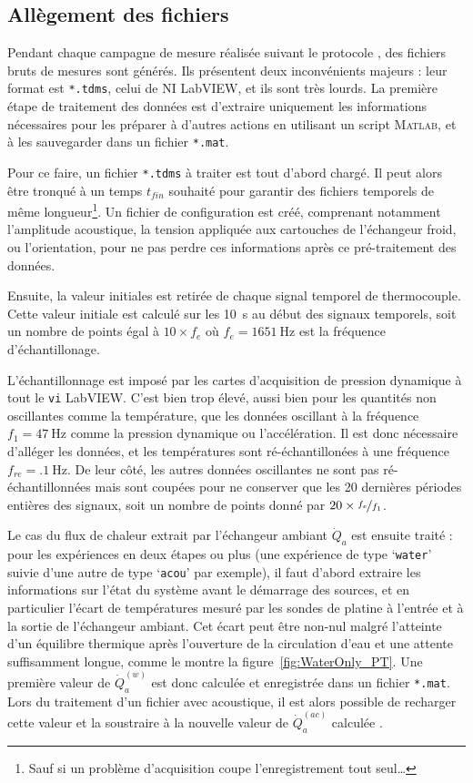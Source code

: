 \subsection{Allègement des fichiers}
Pendant chaque campagne de mesure réalisée suivant le protocole , des fichiers bruts de mesures sont générés. Ils présentent deux inconvénients majeurs : leur format est \texttt{*.tdms}, celui de NI LabVIEW, et ils sont très lourds. La première étape de traitement des données est d'extraire uniquement les informations nécessaires pour les préparer à d'autres actions en utilisant un script \textsc{Matlab}\textss\textregistered, et à les sauvegarder dans un fichier \texttt{*.mat}.\medskip

Pour ce faire, un fichier \texttt{*.tdms} à traiter est tout d'abord chargé. Il peut alors être tronqué à un temps $t_{fin}$ souhaité pour garantir des fichiers temporels de même longueur\footnote{Sauf si un problème d'acquisition coupe l'enregistrement tout seul\dots}. Un fichier de configuration est créé, comprenant notamment l'amplitude acoustique, la tension appliquée aux cartouches de l'échangeur froid, ou l'orientation, pour ne pas perdre ces informations après ce pré-traitement des données.\smallskip

Ensuite, la valeur initiales est retirée de chaque signal temporel de thermocouple. Cette valeur initiale est calculé sur les \qty{10}{\second} au début des signaux temporels, soit un nombre de points égal à $10 \times f_{e}$ où $f_{e}=\qty{1651}{\hertz}$ est la fréquence d'échantillonage.\smallskip

L'échantillonnage est imposé par les cartes d'acquisition de pression dynamique à tout le \texttt{vi} LabVIEW. C'est bien trop élevé, aussi bien pour les quantités non oscillantes comme la température, que les données oscillant à la fréquence $f_1=\qty{47}{\hertz}$ comme la pression dynamique ou l'accélération. Il est donc nécessaire d'alléger les données, et les températures sont ré-échantillonées à une fréquence $f_{re}=\qty{.1}{\hertz}$. De leur côté, les autres données oscillantes ne sont pas ré-échantillonnées mais sont coupées pour ne conserver que les \num{20} dernières périodes entières des signaux, soit un nombre de points donné par $20 \times \nicefrac{f_e}{f_1}$.\smallskip

Le cas du flux de chaleur extrait par l'échangeur ambiant $\dot Q_a$ est ensuite traité : pour les expériences en deux étapes ou plus (une expérience de type `\texttt{water}' suivie d'une autre de type `\texttt{acou}' par exemple), il faut d'abord extraire les informations sur l'état du système avant le démarrage des sources, et en particulier l'écart de températures mesuré par les sondes de platine à l'entrée et à la sortie de l'échangeur ambiant. Cet écart peut être non-nul malgré l'atteinte d'un équilibre thermique après l'ouverture de la circulation d'eau et une attente suffisamment longue, comme le montre la figure~\ref{fig:WaterOnly_PT}. Une première valeur de $\dot Q_a^{(w)}$ est donc calculée et enregistrée dans un fichier \texttt{*.mat}. Lors du traitement d'un fichier avec acoustique, il est alors possible de recharger cette valeur et la soustraire à la nouvelle valeur de $\dot Q_a^{(ac)}$ calculée .\smallskip

